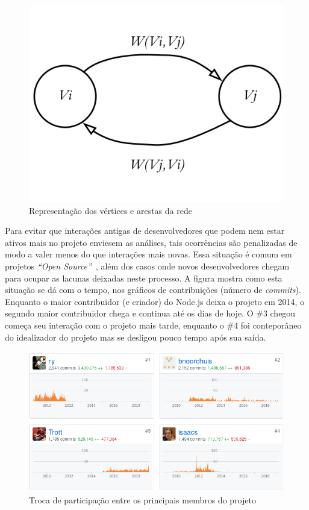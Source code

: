 \documentclass[12pt,openany,oneside,a4paper,english,brazil]{abntbibufjf}
\begin{document}
\begin{figure}[htbp]
 \includegraphics[width=.7\textwidth]{relationship}
 \caption{Representação dos vértices e arestas da rede}\label{fig:relationship}
\end{figure}

Para evitar que interações antigas de desenvolvedores que podem nem estar ativos mais no projeto enviesem as análises, tais ocorrências são penalizadas de modo a valer menos do que interações mais novas. Essa situação é comum em projetos \textit{``Open Source''}~\cite{fogel2005}, além dos casos onde novos desenvolvedores chegam para ocupar as lacunas deixadas neste processo. A figura mostra como esta situação se dá com o tempo, nos gráficos de contribuições (número de \textit{commits}). Enquanto o maior contribuidor (e criador) do Node.js deixa o projeto em 2014, o segundo maior contribuidor chega e continua até os dias de hoje. O \#3 chegou começa seu interação com o projeto mais tarde, enquanto o \#4 foi conteporâneo do idealizador do projeto mas se desligou pouco tempo após sua saída.

\begin{figure}[htbp]
 \includegraphics[width=\textwidth]{abandon-nodejs}
 \caption{Troca de participação entre os principais membros do projeto}\label{fig:abandon-nodejs}
\end{figure}
\end{document}
